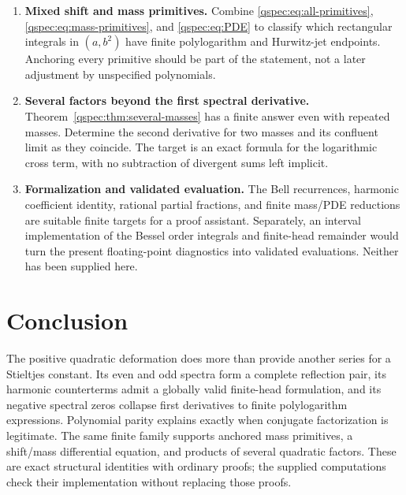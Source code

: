 \begin{enumerate}
\item \textbf{Mixed shift and mass primitives.}
Combine \eqref{qspec:eq:all-primitives},
\eqref{qspec:eq:mass-primitives}, and \eqref{qspec:eq:PDE} to classify
which rectangular integrals in $(a,b^2)$ have finite polylogarithm and
Hurwitz-jet endpoints. Anchoring every primitive should be part of the
statement, not a later adjustment by unspecified polynomials.

\item \textbf{Several factors beyond the first spectral derivative.}
Theorem~\ref{qspec:thm:several-masses} has a finite answer even with
repeated masses. Determine the second derivative for two masses and
its confluent limit as they coincide. The target is an exact formula
for the logarithmic cross term, with no subtraction of divergent sums
left implicit.

\item \textbf{Formalization and validated evaluation.}
The Bell recurrences, harmonic coefficient identity, rational partial
fractions, and finite mass/PDE reductions are suitable finite targets
for a proof assistant. Separately, an interval implementation of the
Bessel order integrals and finite-head remainder would turn the present
floating-point diagnostics into validated evaluations. Neither has
been supplied here.
\end{enumerate}

\section*{Conclusion}
The positive quadratic deformation does more than provide another series
for a Stieltjes constant. Its even and odd spectra form a complete
reflection pair, its harmonic counterterms admit a globally valid
finite-head formulation, and its negative spectral zeros collapse first
derivatives to finite polylogarithm expressions. Polynomial parity
explains exactly when conjugate factorization is legitimate. The same
finite family supports anchored mass primitives, a shift/mass differential
equation, and products of several quadratic factors. These are exact
structural identities with ordinary proofs; the supplied computations
check their implementation without replacing those proofs.
